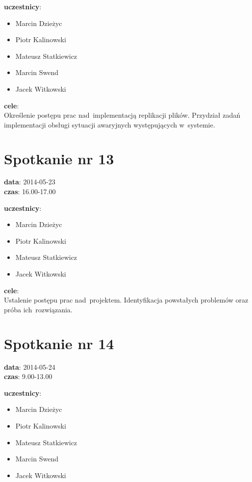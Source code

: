 \vspace{5mm}
\noindent
\textbf{uczestnicy}:
\begin{itemize}
	\item Marcin Dzieżyc
	\item Piotr Kalinowski
	\item Mateusz Statkiewicz
	\item Marcin Swend
	\item Jacek Witkowski
\end{itemize}

\vspace{5mm}
\noindent
\textbf{cele}: \\
Określenie postępu prac nad~implementacją replikacji plików. Przydział zadań
implementacji obsługi sytuacji awaryjnych występujących w~systemie.

\section[Spotkanie nr 13][Spotkanie nr 13]{Spotkanie nr 13}

\noindent
\textbf{data}: 2014-05-23 \\
\textbf{czas}: 16.00-17.00

\vspace{5mm}
\noindent
\textbf{uczestnicy}:
\begin{itemize}
	\item Marcin Dzieżyc
	\item Piotr Kalinowski
	\item Mateusz Statkiewicz
	\item Jacek Witkowski
\end{itemize}

\vspace{5mm}
\noindent
\textbf{cele}: \\
Ustalenie postępu prac nad~projektem. Identyfikacja powstałych problemów oraz
próba ich~rozwiązania.

\section[Spotkanie nr 14][Spotkanie nr 14]{Spotkanie nr 14}

\noindent
\textbf{data}: 2014-05-24 \\
\textbf{czas}: 9.00-13.00

\vspace{5mm}
\noindent
\textbf{uczestnicy}:
\begin{itemize}
	\item Marcin Dzieżyc
	\item Piotr Kalinowski
	\item Mateusz Statkiewicz
	\item Marcin Swend
	\item Jacek Witkowski
\end{itemize}


